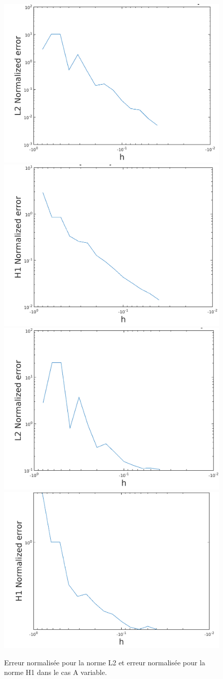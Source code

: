 \documentclass[11pt]{article}
\begin{document}
\begin{figure}
  \centering
  \includegraphics[width=.48\textwidth]{periodique/L2_Acst} 
  \includegraphics[width=.48\textwidth]{periodique/H1_Acst} \\
  \includegraphics[width=.48\textwidth]{periodique/L2_Avar} 
  \includegraphics[width=.48\textwidth]{periodique/H1_Avar}
  \caption{Erreur normalisée pour la norme L2 et erreur normalisée pour la norme H1 dans le cas A variable.}
  \label{fig:avar}
\end{figure}
\end{document}
